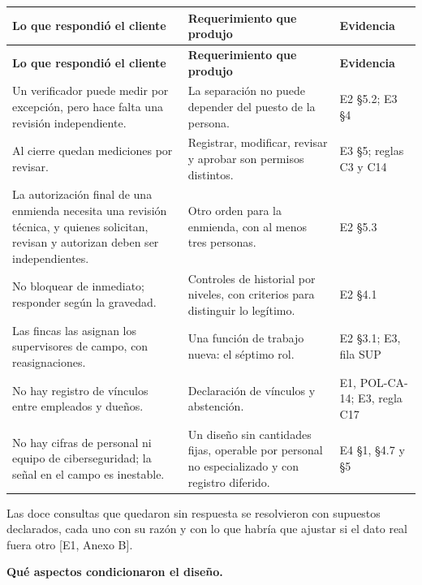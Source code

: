 \documentclass[11pt,letterpaper]{article}
\newcommand{\cab}[1]{\textbf{\rmfamily #1}}
\newcommand{\ev}[1]{\textrm{\small [#1]}}   %
\begin{document}
{\small
\renewcommand{\arraystretch}{1.22}
\begin{longtable}{@{}L{6.3cm} L{5.9cm} L{3.4cm}@{}}
\toprule
\cab{Lo que respondió el cliente} & \cab{Requerimiento que produjo} & \cab{Evidencia} \\
\midrule
\endfirsthead
\toprule
\cab{Lo que respondió el cliente} & \cab{Requerimiento que produjo} & \cab{Evidencia} \\
\midrule
\endhead
\bottomrule
\endfoot
Un verificador puede medir por excepción, pero hace falta una revisión independiente. & La separación no puede depender del puesto de la persona. & E2 §5.2; E3 §4 \\
Al cierre quedan mediciones por revisar. & Registrar, modificar, revisar y aprobar son permisos distintos. & E3 §5; reglas C3 y C14 \\
La autorización final de una enmienda necesita una revisión técnica, y quienes solicitan, revisan y autorizan deben ser independientes. & Otro orden para la enmienda, con al menos tres personas. & E2 §5.3 \\
No bloquear de inmediato; responder según la gravedad. & Controles de historial por niveles, con criterios para distinguir lo legítimo. & E2 §4.1 \\
Las fincas las asignan los supervisores de campo, con reasignaciones. & Una función de trabajo nueva: el séptimo rol. & E2 §3.1; E3, fila SUP \\
No hay registro de vínculos entre empleados y dueños. & Declaración de vínculos y abstención. & E1, POL-CA-14; E3, regla C17 \\
No hay cifras de personal ni equipo de ciberseguridad; la señal en el campo es inestable. & Un diseño sin cantidades fijas, operable por personal no especializado y con registro diferido. & E4 §1, §4.7 y §5 \\
\end{longtable}
}

Las doce consultas que quedaron sin respuesta se resolvieron con supuestos declarados, cada uno con su
razón y con lo que habría que ajustar si el dato real fuera otro \ev{E1, Anexo B}.

\Needspace{6cm}
\textbf{Qué aspectos condicionaron el diseño.}
\end{document}
